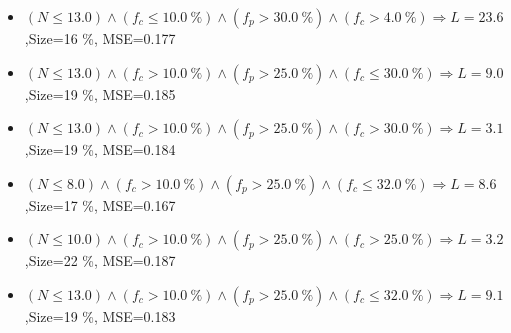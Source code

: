 \documentclass[numbered]{CSL}
\begin{document}
\begin{itemize}
\item $(N \leq 13.0) \land (f_c \leq 10.0~\%) \land (f_p > 30.0~\%) \land (f_c > 4.0~\%) \Rightarrow L = 23.6$,\hfill Size=16 \%, MSE=0.177
\item $(N \leq 13.0) \land (f_c > 10.0~\%) \land (f_p > 25.0~\%) \land (f_c \leq 30.0~\%) \Rightarrow L = 9.0$,\hfill Size=19 \%, MSE=0.185
\item $(N \leq 13.0) \land (f_c > 10.0~\%) \land (f_p > 25.0~\%) \land (f_c > 30.0~\%) \Rightarrow L = 3.1$,\hfill Size=19 \%, MSE=0.184
\item $(N \leq 8.0) \land (f_c > 10.0~\%) \land (f_p > 25.0~\%) \land (f_c \leq 32.0~\%) \Rightarrow L = 8.6$,\hfill Size=17 \%, MSE=0.167
\item $(N \leq 10.0) \land (f_c > 10.0~\%) \land (f_p > 25.0~\%) \land (f_c > 25.0~\%) \Rightarrow L = 3.2$,\hfill Size=22 \%, MSE=0.187
\item $(N \leq 13.0) \land (f_c > 10.0~\%) \land (f_p > 25.0~\%) \land (f_c \leq 32.0~\%) \Rightarrow L = 9.1$,\hfill Size=19 \%, MSE=0.183
\end{itemize}
\end{document}
